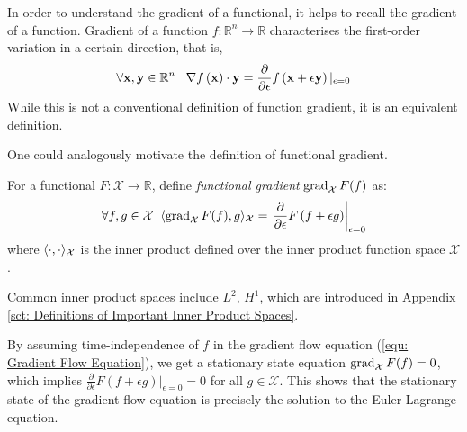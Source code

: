 \documentclass[../dissertation.tex]{subfiles}
\begin{document}
In order to understand the gradient of a functional, it helps to recall the gradient of a function.
Gradient of a function $f:\mathbb{R}^n \rightarrow \mathbb{R}$ characterises the first-order variation in a certain direction,
that is,
\begin{equation}
    \forall \mathbf{x}, \mathbf{y} \in \mathbb{R}^n \; \; \;
    \nabla f \left( \mathbf{x} \right) \cdot \mathbf{y} = \frac{\partial}{\partial \epsilon} f\left( \mathbf{x} + \epsilon \mathbf{y} \right)|_{\epsilon=0}
\end{equation}
While this is not a conventional definition of function gradient, it is an equivalent definition.

One could analogously motivate the definition of functional gradient.
\begin{definition}
    For a functional $F:\mathcal{X} \rightarrow \mathbb{R}$, define \textit{functional gradient} $\operatorname{grad}_{\mathcal{X}} F (f)$ as:
    \begin{equation}
        \forall f, g \in \mathcal{X} \; \; \langle \operatorname{grad}_{\mathcal{X}} F (f), g \rangle_{\mathcal{X}} = \left.\frac{\partial}{\partial \epsilon} F \left( f + \epsilon g \right)\right|_{\epsilon = 0}
        \label{equ: Functional Gradient Definition}
    \end{equation}
    where $\langle \cdot, \cdot \rangle_{\mathcal{X}}$ is the inner product defined over the inner product function space $\mathcal{X}$.
\end{definition}

Common inner product spaces include $L^2$, $H^1$, which are introduced in Appendix \ref{sct: Definitions of Important Inner Product Spaces}.

\begin{remark}
    By assuming time-independence of $f$ in the gradient flow equation (\ref{equ: Gradient Flow Equation}), we get a stationary state equation $\operatorname{grad}_{\mathcal{X}} F(f) = 0$,
    which implies $\frac{\partial}{\partial \epsilon} F \left( f + \epsilon g \right)|_{\epsilon=0} = 0$ for all $g \in \mathcal{X}$.
    This shows that the stationary state of the gradient flow equation is precisely the solution to the Euler-Lagrange equation.
\end{remark}
\end{document}
